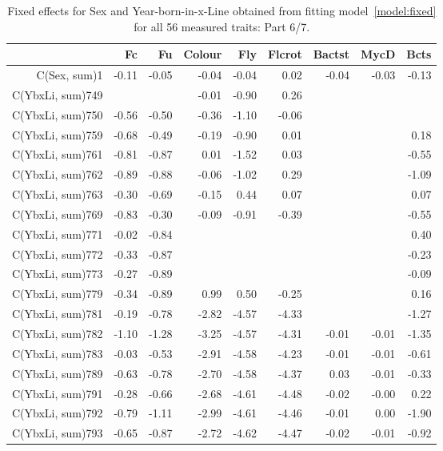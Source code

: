 \begin{table}[p]
\centering
\caption{Fixed effects for Sex and Year-born-in-x-Line obtained from fitting model~\ref{model:fixed} for all 56 measured traits: Part 6/7.}
\label{tab:b6}
\begin{tabular}{rrrrrrrrr}
  \hline
 & Fc & Fu & Colour & Fly & Flcrot & Bactst & MycD & Bcts \\ 
  \hline
C(Sex, sum)1 & -0.11 & -0.05 & -0.04 & -0.04 & 0.02 & -0.04 & -0.03 & -0.13 \\ 
  C(YbxLi, sum)749 &  &  & -0.01 & -0.90 & 0.26 &  &  &  \\ 
  C(YbxLi, sum)750 & -0.56 & -0.50 & -0.36 & -1.10 & -0.06 &  &  &  \\ 
  C(YbxLi, sum)759 & -0.68 & -0.49 & -0.19 & -0.90 & 0.01 &  &  & 0.18 \\ 
  C(YbxLi, sum)761 & -0.81 & -0.87 & 0.01 & -1.52 & 0.03 &  &  & -0.55 \\ 
  C(YbxLi, sum)762 & -0.89 & -0.88 & -0.06 & -1.02 & 0.29 &  &  & -1.09 \\ 
  C(YbxLi, sum)763 & -0.30 & -0.69 & -0.15 & 0.44 & 0.07 &  &  & 0.07 \\ 
  C(YbxLi, sum)769 & -0.83 & -0.30 & -0.09 & -0.91 & -0.39 &  &  & -0.55 \\ 
  C(YbxLi, sum)771 & -0.02 & -0.84 &  &  &  &  &  & 0.40 \\ 
  C(YbxLi, sum)772 & -0.33 & -0.87 &  &  &  &  &  & -0.23 \\ 
  C(YbxLi, sum)773 & -0.27 & -0.89 &  &  &  &  &  & -0.09 \\ 
  C(YbxLi, sum)779 & -0.34 & -0.89 & 0.99 & 0.50 & -0.25 &  &  & 0.16 \\ 
  C(YbxLi, sum)781 & -0.19 & -0.78 & -2.82 & -4.57 & -4.33 &  &  & -1.27 \\ 
  C(YbxLi, sum)782 & -1.10 & -1.28 & -3.25 & -4.57 & -4.31 & -0.01 & -0.01 & -1.35 \\ 
  C(YbxLi, sum)783 & -0.03 & -0.53 & -2.91 & -4.58 & -4.23 & -0.01 & -0.01 & -0.61 \\ 
  C(YbxLi, sum)789 & -0.63 & -0.78 & -2.70 & -4.58 & -4.37 & 0.03 & -0.01 & -0.33 \\ 
  C(YbxLi, sum)791 & -0.28 & -0.66 & -2.68 & -4.61 & -4.48 & -0.02 & -0.00 & 0.22 \\ 
  C(YbxLi, sum)792 & -0.79 & -1.11 & -2.99 & -4.61 & -4.46 & -0.01 & 0.00 & -1.90 \\ 
  C(YbxLi, sum)793 & -0.65 & -0.87 & -2.72 & -4.62 & -4.47 & -0.02 & -0.01 & -0.92 \\ 

\end{tabular}
\end{table}
